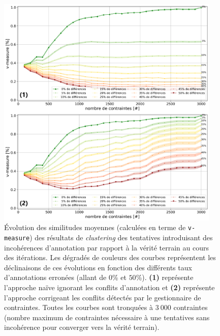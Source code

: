 			\begin{figure}[!htb]
				\centering
				\includegraphics[width=0.95\textwidth]{figures/etude-erreur-interet-correction-closest}
				\caption{
					Évolution des similitudes moyennes (calculées en terme de \texttt{v-measure}) des résultats de \textit{clustering} des tentatives introduisant des incohérences d'annotation par rapport à la vérité terrain au cours des itérations.
					Les dégradés de couleurs des courbes représentent les déclinaisons de ces évolutions en fonction des différents taux d'annotations erronées (allant de $0$\% et $50$\%).
					\textbf{(1)} représente l'approche naïve ignorant les conflits d'annotation
					et \textbf{(2)} représente l'approche corrigeant les conflits détectés par le gestionnaire de contraintes.
					Toutes les courbes sont tronquées à $3~000$ contraintes (nombre maximum de contraintes nécessaire à une tentatives sans incohérence pour converger vers la vérité terrain).
				}
				\label{figure:4.6.1-ETUDE-ROBUSTESSE-INTERET-CORRECTION-INCOHERENCES}
			\end{figure}
			
